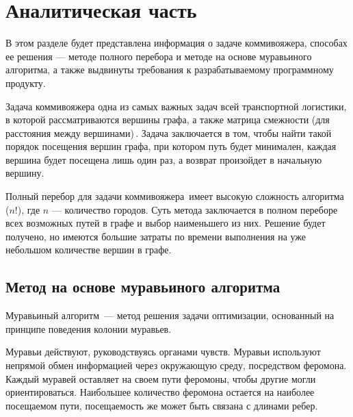 \chapter{Аналитическая часть}

В этом разделе будет представлена информация о задаче коммивояжера, способах ее решения --- методе полного перебора и методе на основе муравьиного алгоритма, а также выдвинуты требования к разрабатываемому программному продукту.

Задача коммивояжера одна из самых важных задач всей транспортной логистики, в которой рассматриваются вершины графа, а также матрица смежности (для расстояния между вершинами)\,\cite{task}. 
Задача заключается в том, чтобы найти такой порядок посещения вершин графа, при котором путь будет минимален, каждая вершина будет посещена лишь один раз, а возврат произойдет в начальную вершину. 


Полный перебор для задачи коммивояжера\,\cite{full-comb} имеет высокую сложность алгоритма ($n!$), где $n$ --- количество городов. 
Суть метода заключается в полном переборе всех возможных путей в графе и выбор наименьшего из них. 
Решение будет получено, но имеются большие затраты по времени выполнения на уже небольшом количестве вершин в графе.

\section{Метод на основе муравьиного алгоритма}

Муравьиный алгоритм\,\cite{full-comb} --- метод решения задачи оптимизации, основанный на принципе поведения колонии муравьев.

Муравьи действуют, руководствуясь органами чувств. 
Муравьи используют непрямой обмен информацией через окружающую среду, посредством феромона.
Каждый муравей оставляет на своем пути феромоны, чтобы другие могли ориентироваться. 
Наибольшее количество феромона остается на наиболее посещаемом пути, посещаемость же может быть связана с длинами ребер.

